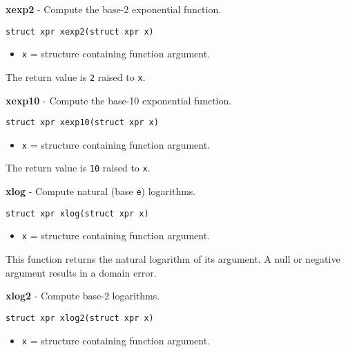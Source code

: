 \documentclass{article}
\begin{document}
\hrulefill{}

\textbf{xexp2} - Compute the base-2 exponential function.

\begin{verbatim}
struct xpr xexp2(struct xpr x)
\end{verbatim}

\begin{itemize}
\item \texttt{x} = structure containing function argument.
\end{itemize}

The return value is \texttt{2} raised to \texttt{x}.


\hrulefill{}

\textbf{xexp10} - Compute the base-10 exponential function.

\begin{verbatim}
struct xpr xexp10(struct xpr x)
\end{verbatim}

\begin{itemize}
\item \texttt{x} = structure containing function argument.
\end{itemize}

The return value is \texttt{10} raised to \texttt{x}.


\hrulefill{}

\textbf{xlog} - Compute natural (base \texttt{e}) logarithms.

\begin{verbatim}
struct xpr xlog(struct xpr x)
\end{verbatim}

\begin{itemize}
\item \texttt{x} = structure containing function argument.
\end{itemize}

This function returns the natural logarithm of
its argument. A null or negative argument results in a
domain error.


\hrulefill{}

\textbf{xlog2} - Compute base-2 logarithms.

\begin{verbatim}
struct xpr xlog2(struct xpr x)
\end{verbatim}

\begin{itemize}
\item \texttt{x} = structure containing function argument.
\end{itemize}
\end{document}

